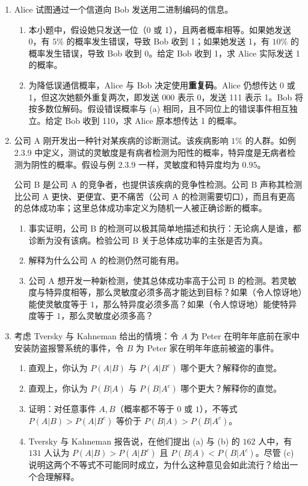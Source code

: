 \documentclass[UTF8, 12pt, fontset=fandol, oneside]{ctexart}
\begin{document}
\begin{enumerate}
  \item Alice 试图通过一个信道向 Bob 发送用二进制编码的信息。
  \begin{enumerate}
    \item 本小题中，假设她只发送一位（0 或 1），且两者概率相等。如果她发送 0，有 $5\%$ 的概率发生错误，导致 Bob 收到 1；如果她发送 1，有 $10\%$ 的概率发生错误，导致 Bob 收到 0。给定 Bob 收到 1，求 Alice 实际发送 1 的概率。
    \item 为降低误通信概率，Alice 与 Bob 决定使用\textbf{重复码}。Alice 仍想传达 0 或 1，但这次她额外重复两次，即发送 000 表示 0，发送 111 表示 1。Bob 将按多数位解码。假设错误概率与 (a) 相同，且不同位上的错误事件相互独立。给定 Bob 收到 110，求 Alice 原本想传达 1 的概率。
  \end{enumerate}

  \item 公司 A 刚开发出一种针对某疾病的诊断测试。该疾病影响 $1\%$ 的人群。如例 2.3.9 中定义，测试的灵敏度是有病者检测为阳性的概率，特异度是无病者检测为阴性的概率。假设与例 2.3.9 一样，灵敏度和特异度均为 $0.95$。

  公司 B 是公司 A 的竞争者，也提供该疾病的竞争性检测。公司 B 声称其检测比公司 A 更快、更便宜、更不痛苦（公司 A 的检测需要切口），而且有更高的总体成功率；这里总体成功率定义为随机一人被正确诊断的概率。
  \begin{enumerate}
    \item 事实证明，公司 B 的检测可以极其简单地描述和执行：无论病人是谁，都诊断为没有该病。检验公司 B 关于总体成功率的主张是否为真。
    \item 解释为什么公司 A 的检测仍然可能有用。
    \item 公司 A 想开发一种新检测，使其总体成功率高于公司 B 的检测。若灵敏度与特异度相等，那么灵敏度必须多高才能达到目标？如果（令人惊讶地）能使灵敏度等于 $1$，那么特异度必须多高？如果（令人惊讶地）能使特异度等于 $1$，那么灵敏度必须多高？
  \end{enumerate}

  \item 考虑 Tversky 与 Kahneman 给出的情境：令 $A$ 为 Peter 在明年年底前在家中安装防盗报警系统的事件，令 $B$ 为 Peter 家在明年年底前被盗的事件。
  \begin{enumerate}
    \item 直观上，你认为 $P(A|B)$ 与 $P(A|B^c)$ 哪个更大？解释你的直觉。
    \item 直观上，你认为 $P(B|A)$ 与 $P(B|A^c)$ 哪个更大？解释你的直觉。
    \item 证明：对任意事件 $A,B$（概率都不等于 $0$ 或 $1$），不等式 $P(A|B)>P(A|B^c)$ 等价于 $P(B|A)>P(B|A^c)$。
    \item Tversky 与 Kahneman 报告说，在他们提出 (a) 与 (b) 的 $162$ 人中，有 $131$ 人认为 $P(A|B)>P(A|B^c)$ 且 $P(B|A)<P(B|A^c)$。尽管 (c) 说明这两个不等式不可能同时成立，为什么这种意见会如此流行？给出一个合理解释。
  \end{enumerate}


\end{enumerate}
\end{document}
